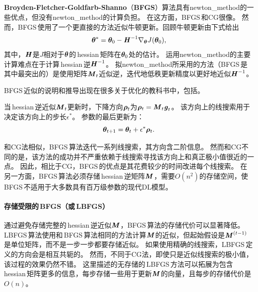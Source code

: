 \subsection{}
\label{sec:bfgs}
\textbf{Broyden-Fletcher-Goldfarb-Shanno}（\textbf{\gls{BFGS}}）算法具有\gls{newton_method}的一些优点，但没有\gls{newton_method}的计算负担。
在这方面，\gls{BFGS}\,和CG很像。
然而，\gls{BFGS}\,使用了一个更直接的方法近似牛顿更新。回顾牛顿更新由下式给出
\begin{equation}
    \boldsymbol{\theta}^* = \boldsymbol{\theta}_0 - \boldsymbol{\mathit{H}}^{-1} \nabla_{\boldsymbol{\theta}} J(\boldsymbol{\theta}_0),
\end{equation}
其中，$\boldsymbol{\mathit{H}}$是$J$相对于$\boldsymbol{\theta}$的\,\gls{hessian}\,矩阵在$\boldsymbol{\theta}_0$处的估计。
运用\gls{newton_method}的主要计算难点在于计算\,\gls{hessian}\,逆$\boldsymbol{\mathit{H}}^{-1}$。
拟\gls{newton_method}所采用的方法（\gls{BFGS}\,是其中最突出的）是使用矩阵$\boldsymbol{\mathit{M}}_t$近似逆，迭代地低秩更新精度以更好地近似$\boldsymbol{\mathit{H}}^{-1}$。


\gls{BFGS}\,近似的说明和推导出现在很多关于优化的教科书中，包括\cite{Lue84}。

当\,\gls{hessian}\,逆近似$\boldsymbol{\mathit{M}}_t$更新时，下降方向$\boldsymbol{\rho}_t$为$\boldsymbol{\rho}_t = \boldsymbol{\mathit{M}}_t \boldsymbol{\mathit{g}}_t$。
该方向上的线搜索用于决定该方向上的步长$\epsilon^*$。
参数的最后更新为：
\begin{equation}
    \boldsymbol{\theta}_{t+1} = \boldsymbol{\theta}_t + \epsilon^* \boldsymbol{\rho}_t.
\end{equation}

和\gls{CG}法相似，\gls{BFGS}\,算法迭代一系列线搜索，其方向含二阶信息。
然而和\gls{CG}不同的是，该方法的成功并不严重依赖于线搜索寻找该方向上和真正极小值很近的一点。
因此，相比于\gls{CG}，\gls{BFGS}\,的优点是其花费较少的时间改进每个线搜索。
在另一方面，\gls{BFGS}\,算法必须存储\,\gls{hessian}\,逆矩阵$\boldsymbol{\mathit{M}}$，需要$O(n^2)$的存储空间，使\,\gls{BFGS}\,不适用于大多数具有百万级参数的现代\gls{DL}模型。

\paragraph{存储受限的\,\gls{BFGS}（或\,\gls{LBFGS}）}
通过避免存储完整的\,\gls{hessian}\,逆近似$\boldsymbol{\mathit{M}}$，\gls{BFGS}\,算法的存储代价可以显著降低。
\gls{LBFGS}\,算法使用和\,\gls{BFGS}\,算法相同的方法计算$\boldsymbol{\mathit{M}}$的近似，但起始假设是$\boldsymbol{\mathit{M}}^{(t-1)}$是单位矩阵，而不是一步一步都要存储近似。
如果使用精确的线搜索，\gls{LBFGS}\,定义的方向会是相互共轭的。
然而，不同于\gls{CG}法，即使只是近似线搜索的极小值，该过程的效果仍然不错。
这里描述的无存储的\,\gls{LBFGS}\,方法可以拓展为包含\,\gls{hessian}\,矩阵更多的信息，每步存储一些用于更新$\boldsymbol{\mathit{M}}$的向量，且每步的存储代价是$O(n)$。

